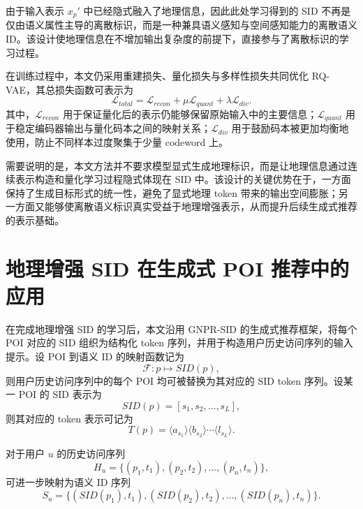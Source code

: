 由于输入表示 $x_p'$ 中已经隐式融入了地理信息，因此此处学习得到的 SID 不再是仅由语义属性主导的离散标识，而是一种兼具语义感知与空间感知能力的离散语义 ID。该设计使地理信息在不增加输出复杂度的前提下，直接参与了离散标识的学习过程。

在训练过程中，本文仍采用重建损失、量化损失与多样性损失共同优化 RQ-VAE，其总损失函数可表示为
\begin{equation}
\mathcal{L}_{total} = \mathcal{L}_{recon} + \mu \mathcal{L}_{quant} + \lambda \mathcal{L}_{div}.
\end{equation}
其中，$\mathcal{L}_{recon}$ 用于保证量化后的表示仍能够保留原始输入中的主要信息；$\mathcal{L}_{quant}$ 用于稳定编码器输出与量化码本之间的映射关系；$\mathcal{L}_{div}$ 用于鼓励码本被更加均衡地使用，防止不同样本过度聚集于少量 codeword 上。

需要说明的是，本文方法并不要求模型显式生成地理标识，而是让地理信息通过连续表示构造和量化学习过程隐式体现在 SID 中。该设计的关键优势在于，一方面保持了生成目标形式的统一性，避免了显式地理 token 带来的输出空间膨胀；另一方面又能够使离散语义标识真实受益于地理增强表示，从而提升后续生成式推荐的表示基础。

\section{地理增强 SID 在生成式 POI 推荐中的应用}
\label{sec:geo_sid_application}

在完成地理增强 SID 的学习后，本文沿用 GNPR-SID 的生成式推荐框架，将每个 POI 对应的 SID 组织为结构化 token 序列，并用于构造用户历史访问序列的输入提示。设 POI 到语义 ID 的映射函数记为
\begin{equation}
\mathcal{F}: p \mapsto SID(p),
\end{equation}
则用户历史访问序列中的每个 POI 均可被替换为其对应的 SID token 序列。设某一 POI 的 SID 表示为
\begin{equation}
SID(p) = [s_1, s_2, \dots, s_L],
\end{equation}
则其对应的 token 表示可记为
\begin{equation}
T(p)=\langle a_{s_1}\rangle \langle b_{s_2}\rangle \cdots \langle l_{s_L}\rangle.
\end{equation}

对于用户 $u$ 的历史访问序列
\begin{equation}
H_u=\{(p_1,t_1),(p_2,t_2),\dots,(p_n,t_n)\},
\end{equation}
可进一步映射为语义 ID 序列
\begin{equation}
S_u=\{(SID(p_1),t_1),(SID(p_2),t_2),\dots,(SID(p_n),t_n)\}.
\end{equation}

